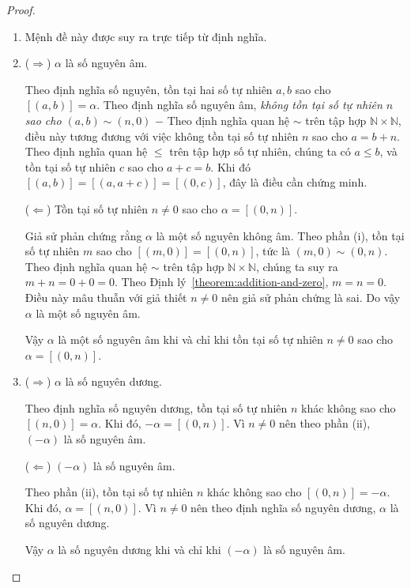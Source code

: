 \begin{proof}
	\begin{enumerate}[label={(\roman*)}]
		\item Mệnh đề này được suy ra trực tiếp từ định nghĩa.
		\item ($\Rightarrow$) $\alpha$ là số nguyên âm.

		      Theo định nghĩa số nguyên, tồn tại hai số tự nhiên $a, b$ sao cho $[(a, b)] = \alpha$. Theo định nghĩa số nguyên âm, \textit{không tồn tại số tự nhiên $n$ sao cho $(a, b)\sim (n, 0)$} $-$ Theo định nghĩa quan hệ $\sim$ trên tập hợp $\mathbb{N}\times\mathbb{N}$, điều này tương đương với việc không tồn tại số tự nhiên $n$ sao cho $a = b + n$. Theo định nghĩa quan hệ $\leq$ trên tập hợp số tự nhiên, chúng ta có $a\leq b$, và tồn tại số tự nhiên $c$ sao cho $a + c = b$. Khi đó $[(a, b)] = [(a, a+c)] = [(0, c)]$, đây là điều cần chứng minh.

		      ($\Leftarrow$) Tồn tại số tự nhiên $n\ne 0$ sao cho $\alpha = [(0, n)]$.

		      Giả sử phản chứng rằng $\alpha$ là một số nguyên không âm. Theo phần (i), tồn tại số tự nhiên $m$ sao cho $[(m, 0)] = [(0, n)]$, tức là $(m, 0)\sim (0, n)$. Theo định nghĩa quan hệ $\sim$ trên tập hợp $\mathbb{N}\times\mathbb{N}$, chúng ta suy ra $m + n = 0 + 0 = 0$. Theo Định lý~\ref{theorem:addition-and-zero}, $m = n = 0$. Điều này mâu thuẫn với giả thiết $n\ne 0$ nên giả sử phản chứng là sai. Do vậy $\alpha$ là một số nguyên âm.

		      Vậy $\alpha$ là một số nguyên âm khi và chỉ khi tồn tại số tự nhiên $n\ne 0$ sao cho $\alpha = [(0, n)]$.
		\item ($\Rightarrow$) $\alpha$ là số nguyên dương.

		      Theo định nghĩa số nguyên dương, tồn tại số tự nhiên $n$ khác không sao cho $[(n, 0)] = \alpha$. Khi đó, $-\alpha = [(0, n)]$. Vì $n\ne 0$ nên theo phần (ii), $(-\alpha)$ là số nguyên âm.

		      ($\Leftarrow$) $(-\alpha)$ là số nguyên âm.

		      Theo phần (ii), tồn tại số tự nhiên $n$ khác không sao cho $[(0, n)] = -\alpha$. Khi đó, $\alpha = [(n, 0)]$. Vì $n\ne 0$ nên theo định nghĩa số nguyên dương, $\alpha$ là số nguyên dương.

		      Vậy $\alpha$ là số nguyên dương khi và chỉ khi $(-\alpha)$ là số nguyên âm.
	\end{enumerate}
\end{proof}

